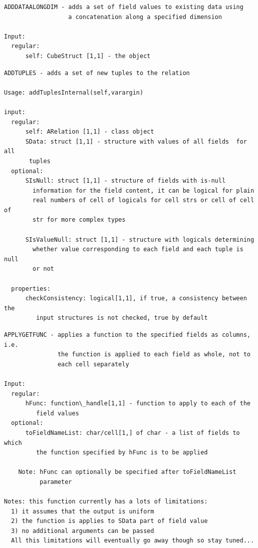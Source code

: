 \documentclass[letterpaper,10pt,english]{sphinxmanual}
\begin{document}
\label{chap_func:smartdb-relations-atypifiedstaticrelation-adddataalongdim}
\begin{Verbatim}[commandchars=\\\{\}]
ADDDATAALONGDIM - adds a set of field values to existing data using
                  a concatenation along a specified dimension

Input:
  regular:
      self: CubeStruct [1,1] - the object
\end{Verbatim}
\label{chap_func:smartdb-relations-atypifiedstaticrelation-addtuples}
\begin{Verbatim}[commandchars=\\\{\}]
ADDTUPLES - adds a set of new tuples to the relation

Usage: addTuplesInternal(self,varargin)

input:
  regular:
      self: ARelation [1,1] - class object
      SData: struct [1,1] - structure with values of all fields  for all
       tuples
  optional:
      SIsNull: struct [1,1] - structure of fields with is-null
        information for the field content, it can be logical for plain
        real numbers of cell of logicals for cell strs or cell of cell of
        str for more complex types

      SIsValueNull: struct [1,1] - structure with logicals determining
        whether value corresponding to each field and each tuple is null
        or not

  properties:
      checkConsistency: logical[1,1], if true, a consistency between the
         input structures is not checked, true by default
\end{Verbatim}
\label{chap_func:smartdb-relations-atypifiedstaticrelation-applygetfunc}
\begin{Verbatim}[commandchars=\\\{\}]
APPLYGETFUNC - applies a function to the specified fields as columns, i.e.
               the function is applied to each field as whole, not to
               each cell separately

Input:
  regular:
      hFunc: function\_handle[1,1] - function to apply to each of the
         field values
  optional:
      toFieldNameList: char/cell[1,] of char - a list of fields to which
         the function specified by hFunc is to be applied

    Note: hFunc can optionally be specified after toFieldNameList
          parameter

Notes: this function currently has a lots of limitations:
  1) it assumes that the output is uniform
  2) the function is applies to SData part of field value
  3) no additional arguments can be passed
  All this limitations will eventually go away though so stay tuned...
\end{Verbatim}
\end{document}
